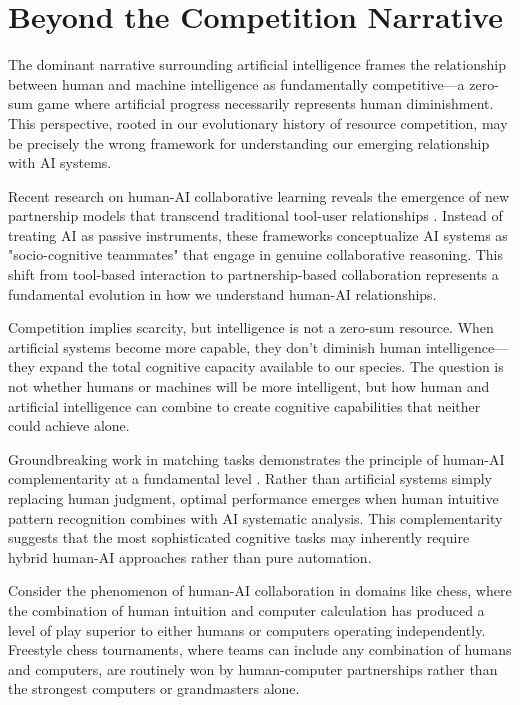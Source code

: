 \section{Beyond the Competition Narrative}

The dominant narrative surrounding artificial intelligence frames the relationship between human and machine intelligence as fundamentally competitive—a zero-sum game where artificial progress necessarily represents human diminishment. This perspective, rooted in our evolutionary history of resource competition, may be precisely the wrong framework for understanding our emerging relationship with AI systems.

Recent research on human-AI collaborative learning reveals the emergence of new partnership models that transcend traditional tool-user relationships \parencite{huang2025agentic}. Instead of treating AI as passive instruments, these frameworks conceptualize AI systems as "socio-cognitive teammates" that engage in genuine collaborative reasoning. This shift from tool-based interaction to partnership-based collaboration represents a fundamental evolution in how we understand human-AI relationships.

Competition implies scarcity, but intelligence is not a zero-sum resource. When artificial systems become more capable, they don't diminish human intelligence—they expand the total cognitive capacity available to our species. The question is not whether humans or machines will be more intelligent, but how human and artificial intelligence can combine to create cognitive capabilities that neither could achieve alone.

Groundbreaking work in matching tasks demonstrates the principle of human-AI complementarity at a fundamental level \parencite{arnaiz2025complementarity}. Rather than artificial systems simply replacing human judgment, optimal performance emerges when human intuitive pattern recognition combines with AI systematic analysis. This complementarity suggests that the most sophisticated cognitive tasks may inherently require hybrid human-AI approaches rather than pure automation.

Consider the phenomenon of human-AI collaboration in domains like chess, where the combination of human intuition and computer calculation has produced a level of play superior to either humans or computers operating independently. Freestyle chess tournaments, where teams can include any combination of humans and computers, are routinely won by human-computer partnerships rather than the strongest computers or grandmasters alone.

